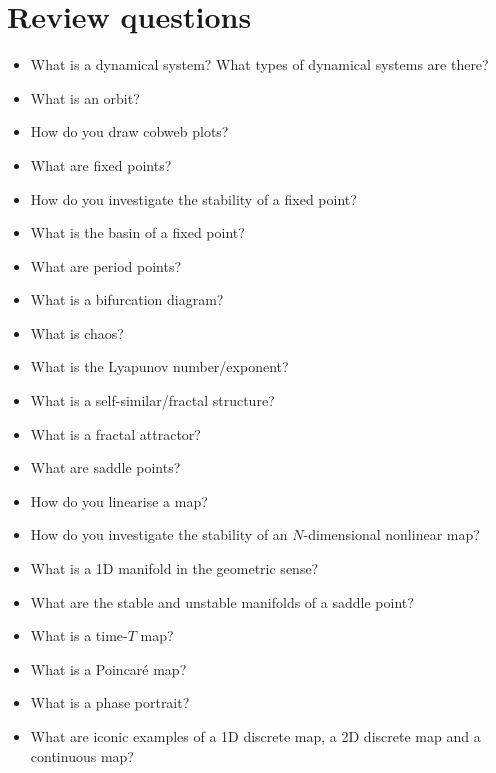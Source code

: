 \pagebreak

\section*{Review questions}

\begin{itemize}
\item What is a dynamical system? What types of dynamical systems are there?
\item What is an orbit?
\item How do you draw cobweb plots?
\item What are fixed points?
\item How do you investigate the stability of a fixed point?
\item What is the basin of a fixed point?
\item What are period points?
\item What is a bifurcation diagram?
\item What is chaos?
\item What is the Lyapunov number/exponent?
\item What is a self-similar/fractal structure? 
\item What is a fractal attractor?
\item What are saddle points?
\item How do you linearise a map? 
\item How do you investigate the stability of an $N$-dimensional nonlinear map? 
\item What is a 1D manifold in the geometric sense?
\item What are the stable and unstable manifolds of a saddle point?
\item What is a time-$T$ map?
\item What is a Poincar\'{e} map?
\item What is a phase portrait?
\item What are iconic examples of a 1D discrete map, a 2D discrete map and a continuous map?
\end{itemize}



